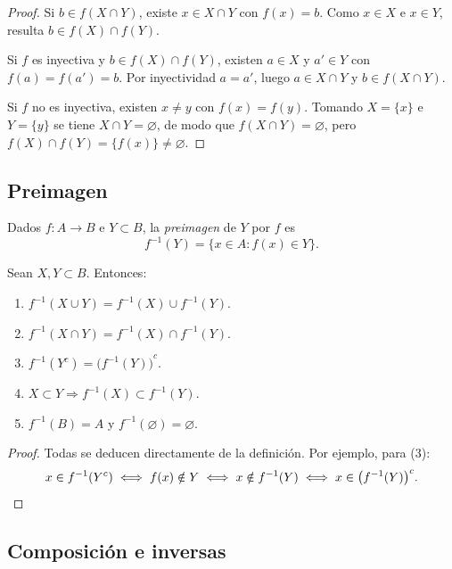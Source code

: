 \begin{proof}
  Si \(b \in f(X \cap Y)\), existe \(x \in X \cap Y\) con \(f(x) = b\). Como \(x \in X\) e \(x \in Y\), resulta \(b \in f(X) \cap f(Y)\).

  Si \(f\) es inyectiva y \(b \in f(X) \cap f(Y)\), existen \(a \in X\) y \(a' \in Y\) con \(f(a) = f(a') = b\). Por inyectividad \(a = a'\), luego \(a \in X \cap Y\) y \(b \in f(X \cap Y)\).

  Si \(f\) no es inyectiva, existen \(x \neq y\) con \(f(x) = f(y)\). Tomando \(X = \{x\}\) e \(Y = \{y\}\) se tiene \(X \cap Y = \varnothing\), de modo que \(f(X \cap Y) = \varnothing\), pero \(f(X) \cap f(Y) = \{f(x)\} \neq \varnothing\).
\end{proof}

\subsection{Preimagen}

\begin{definition}[Preimagen]
  Dados \(f\colon A \to B\) e \(Y \subset B\), la \emph{preimagen} de \(Y\) por \(f\) es
  \[
    f^{-1}(Y) = \{ x \in A : f(x) \in Y \}.
  \]
\end{definition}

\begin{prop}
  Sean \(X, Y \subset B\). Entonces:
  \begin{enumerate}[label=(\arabic*)]
    \item \(f^{-1}(X \cup Y) = f^{-1}(X) \cup f^{-1}(Y)\).
    \item \(f^{-1}(X \cap Y) = f^{-1}(X) \cap f^{-1}(Y)\).
    \item \(f^{-1}(Y^c) = {\bigl(f^{-1}(Y)\bigr)}^c\).
    \item \(X \subset Y \Rightarrow f^{-1}(X) \subset f^{-1}(Y)\).
    \item \(f^{-1}(B) = A\) y \(f^{-1}(\varnothing) = \varnothing\).
  \end{enumerate}
\end{prop}

\begin{proof}
  Todas se deducen directamente de la definición. Por ejemplo, para (3):
  \[
    x \in f^{-1}(Y^c) \iff f(x) \notin Y \iff x \notin f^{-1}(Y) \iff x \in {\bigl(f^{-1}(Y)\bigr)}^c. \qedhere
  \]
\end{proof}

\subsection{Composición e inversas}

